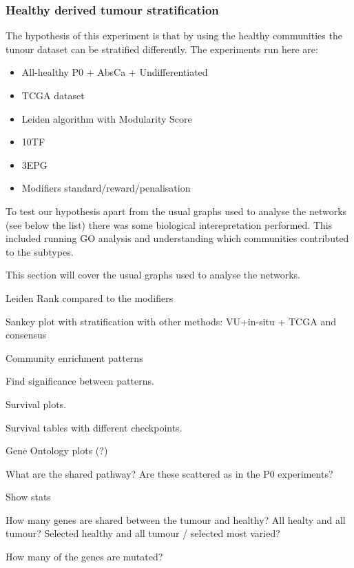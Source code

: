 \subsubsection{Healthy derived tumour stratification} \label{Sec:N_I:h_derived}

The hypothesis of this experiment is that by using the healthy communities the tunour dataset can be stratified differently. The experiments run here are:
\begin{itemize}
    \item All-healthy \- P0 + AbsCa + Undifferentiated
    \item TCGA dataset 
    \item Leiden algorithm with Modularity Score
    \item 10TF
    \item 3EPG
    \item Modifiers standard/reward/penalisation
\end{itemize}

To test our hypothesis apart from the usual graphs used to analyse the networks (see below the list) there was some biological interepretation performed. This included running GO analysis and understanding which communities contributed to the subtypes. 

This section will cover the usual graphs used to analyse the networks.
\begin{todolist}
    \item[\done] Leiden Rank compared to the modifiers
    \item[\done] Sankey plot with stratification with other methods: VU+in-situ + TCGA and consensus
    \item[\done] Community enrichment patterns 
    \item Find significance between patterns.
    \item [\done] Survival plots.
    \item Survival tables with different checkpoints.
    \item Gene Ontology plots (?)
    \item What are the shared pathway? Are these scattered as in the P0 experiments?
    \item Show stats
    \begin{todolist}
        \item How many genes are shared between the tumour and healthy? All healty and all tumour? Selected healthy and all tumour / selected most varied?
        \item How many of the genes are mutated?
    \end{todolist}
\end{todolist}

